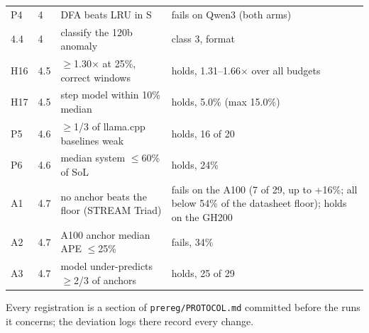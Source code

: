 {\begin{longtable}{llp{6.5cm}p{6.5cm}}
P4 & 4 & DFA beats LRU in S & fails on Qwen3 (both arms) \\
4.4 & 4 & classify the 120b anomaly & class 3, format \\
H16 & 4.5 & $\ge$1.30$\times$ at 25\%, correct windows & holds, 1.31--1.66$\times$ over all budgets \\
H17 & 4.5 & step model within 10\% median & holds, 5.0\% (max 15.0\%) \\
P5 & 4.6 & $\ge$1/3 of llama.cpp baselines weak & holds, 16 of 20 \\
P6 & 4.6 & median system $\le$60\% of SoL & holds, 24\% \\
A1 & 4.7 & no anchor beats the floor (STREAM Triad) & fails on the A100 (7 of 29, up to +16\%; all below 54\% of the datasheet floor); holds on the GH200 \\
A2 & 4.7 & A100 anchor median APE $\le$25\% & fails, 34\% \\
A3 & 4.7 & model under-predicts $\ge$2/3 of anchors & holds, 25 of 29 \\
\end{longtable}}
Every registration is a section of \texttt{prereg/PROTOCOL.md} committed before the runs it concerns; the deviation logs there record every change.
